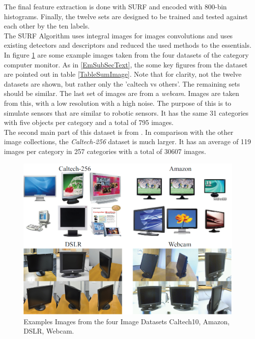The final feature extraction is done with \ac{SURF} and encoded with 800-bin histograms.
Finally, the twelve sets are designed to be trained and tested against each other by the ten labels.\cite{Gong.} \\
The \ac{SURF} Algorithm uses integral images for images convolutions and uses existing detectors and descriptors and reduced the used methods to the essentials. \cite{vanBay.2006} 
In figure \ref{FigExampleImages} are some example images taken from the four datasets of the category computer monitor. 
As in \ref{EmSubSecText}, the some key figures from the dataset are pointed out in table \ref{TableSumImage}.
Note that for clarity, not the twelve datasets are shown, but rather only the 'caltech vs others'.
The remaining sets should be similar.
The last set of images are from a \textit{webcam}.
Images are taken from this, with a low resolution with a high noise. The purpose of this is to simulate sensors that are similar to robotic sensors.
It has the same 31 categories with five objects per category and a total of 795 images. \\
The second main part of this dataset is from \cite{GregGriffin.}. In comparison with the other image collections, the \textit{Caltech-256} dataset is much larger.
It has an average of 119 images per category in 257 categories with a total of 30607 images.
\begin{figure}[]
	\centering
	\includegraphics[width=.8\linewidth]{figures/ExampleImages.png}
	\caption[Example from Image Dataset]{Examples Images from the four Image Datasets Caltech10, Amazon, DSLR, Webcam. \cite{Gong.}}
	\label{FigExampleImages}
\end{figure}
